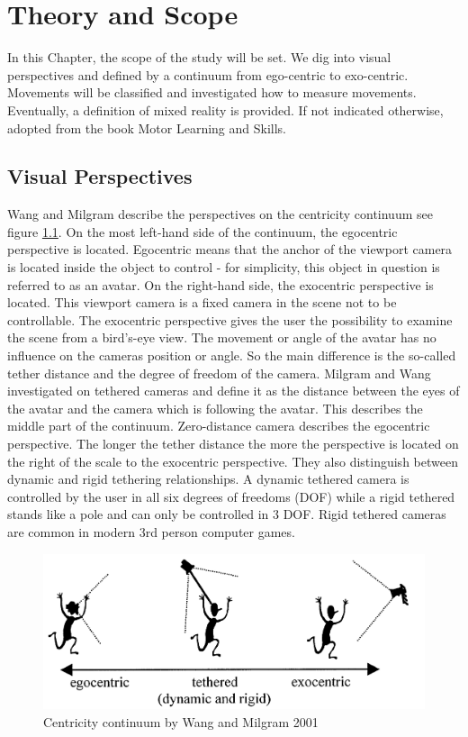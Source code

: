 \chapter{Theory and Scope}
In this Chapter, the scope of the study will be set.  We dig into visual perspectives and defined by a continuum from ego-centric to exo-centric. Movements will be classified and investigated how to measure movements. Eventually, a definition of mixed reality is provided. If not indicated otherwise, adopted from the book Motor Learning and Skills\cite{Schmidt2011}.

\section{Visual Perspectives}
Wang and Milgram \cite{Wang2001} describe the perspectives on the centricity continuum see figure \ref{fig:ego-exo-cont}. On the most left-hand side of the continuum, the egocentric perspective is located. Egocentric means that the anchor of the viewport camera is located inside the object to control - for simplicity, this object in question is referred to as an avatar. On the right-hand side, the exocentric perspective is located. This viewport camera is a fixed camera in the scene not to be controllable. The exocentric perspective gives the user the possibility to examine the scene from a bird's-eye view. The movement or angle of the avatar has no influence on the cameras position or angle. So the main difference is the so-called tether distance and the degree of freedom of the camera. Milgram and Wang investigated on tethered cameras and define it as the distance between the eyes of the avatar and the camera which is following the avatar. This describes the middle part of the continuum. Zero-distance camera describes the egocentric perspective. The longer the tether distance the more the perspective is located on the right of the scale to the exocentric perspective. They also distinguish between dynamic and rigid tethering relationships. A dynamic tethered camera is controlled by the user in all six degrees of freedoms (DOF) while a rigid tethered stands like a pole and can only be controlled in 3 DOF. Rigid tethered cameras are common in modern 3rd person computer games.
\begin{figure}
	\centering
	\includegraphics[width=1.0\textwidth]{img/ego_exo_continuum_bigger.PNG}
	\caption{Centricity continuum by Wang and Milgram 2001 \cite{Wang2001}}
	\label{fig:ego-exo-cont}
\end{figure}

